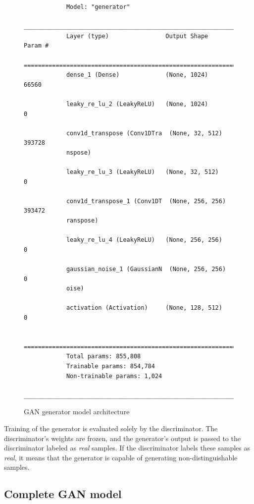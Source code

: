 \documentclass[a4paper, 11pt, twoside]{report}
\theoremstyle{definition}
\begin{document}
\begin{figure}
    \centering
    \begin{tiny}
        \begin{BVerbatim}
            Model: "generator"
            _________________________________________________________________
            Layer (type)                Output Shape              Param #
            =================================================================
            dense_1 (Dense)             (None, 1024)              66560

            leaky_re_lu_2 (LeakyReLU)   (None, 1024)              0

            conv1d_transpose (Conv1DTra  (None, 32, 512)          393728
            nspose)

            leaky_re_lu_3 (LeakyReLU)   (None, 32, 512)           0

            conv1d_transpose_1 (Conv1DT  (None, 256, 256)         393472
            ranspose)

            leaky_re_lu_4 (LeakyReLU)   (None, 256, 256)          0

            gaussian_noise_1 (GaussianN  (None, 256, 256)         0
            oise)

            activation (Activation)     (None, 128, 512)          0

            =================================================================
            Total params: 855,808
            Trainable params: 854,784
            Non-trainable params: 1,024
            _________________________________________________________________
        \end{BVerbatim}
    \end{tiny}
    \caption{GAN generator model architecture}
    \label{fig:gen-arch}
\end{figure}\par

Training of the generator is evaluated solely by the discriminator. The discriminator's weights are frozen, and the generator's output is passed to the discriminator labeled as \textit{real} samples. If the discriminator labels these samples as \textit{real}, it means that the generator is capable of generating non-distinguishable samples. \par

\subsection{Complete GAN model}
\end{document}
